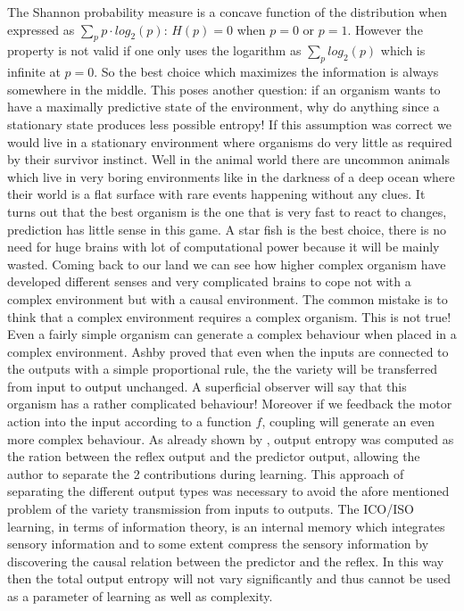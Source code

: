  The Shannon probability measure is a concave function of the distribution when
expressed as $\sum_p p\cdot log_2(p)$: $H(p)=0$ when $p=0$ or $p=1$.
 However the property is not valid if one only uses the logarithm as $\sum_p log_2(p)$ which is infinite at $p=0$.
 So the best choice which maximizes the information is 
 always somewhere in the middle.
 This poses another question: if an organism wants to have
 a maximally predictive state of the environment, why do anything since a
 stationary state produces less possible entropy! If this assumption was correct
we would live in a stationary environment where organisms do very little as required
 by their survivor instinct. Well in the animal
world there are uncommon animals which live in very boring environments like
in the darkness of a deep ocean where their world is a flat surface with rare events
 happening without any clues. It turns out that the best organism is the one that is
very fast to react to changes, prediction has little sense in this game.
A star fish is the best choice, there is no need for huge brains with lot
of computational power because it will be mainly wasted. Coming back
 to our land we can see how higher complex organism have developed different
senses and very complicated brains to cope not with a complex environment but
with a causal environment. The common mistake is to think that a complex environment
 requires a complex organism. This is not true! Even a fairly simple organism
can generate a complex behaviour when placed in a complex environment.
Ashby proved that even when the inputs are connected to the outputs
with a simple proportional rule, the the variety will be transferred
from input to output unchanged. A superficial observer will say that this organism has 
a rather complicated behaviour! Moreover
 if we feedback the motor action into the input according to a function $f$,
coupling will generate an even more complex behaviour. As already shown
by \citet{Kulvicius2009:analysisdifferential}, output entropy
was computed as the ration between the reflex output and the 
predictor output, allowing the author to separate the 2 contributions during learning.
This approach of separating the different output types was necessary to
avoid the afore mentioned problem of the variety transmission from inputs to outputs.
The ICO/ISO learning, in terms of information theory, is an internal
memory which integrates sensory information and to some extent compress the
sensory information by discovering the causal relation between the predictor and the reflex.
In this way then the total output entropy will not vary significantly and thus
cannot be used as a parameter of learning as well as complexity.

